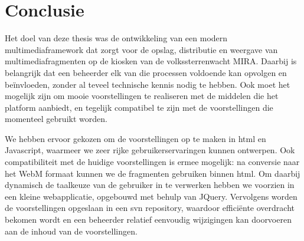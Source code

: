 \chapter{Conclusie}


Het doel van deze thesis was de ontwikkeling van een modern multimediaframework dat zorgt voor de opslag, distributie en weergave van multimediafragmenten op de kiosken van de volkssterrenwacht MIRA. Daarbij is belangrijk dat een beheerder elk van die processen voldoende kan opvolgen en beïnvloeden, zonder al teveel technische kennis nodig te hebben. Ook moet het mogelijk zijn om mooie voorstellingen te realiseren met de middelen die het platform aanbiedt, en tegelijk compatibel te zijn met de voorstellingen die momenteel gebruikt worden.

We hebben ervoor gekozen om de voorstellingen op te maken in \ac{html} en Javascript, waarmeer we zeer rijke gebruikerservaringen kunnen ontwerpen. Ook compatibiliteit met de huidige voorstellingen is ermee mogelijk: na conversie naar het WebM formaat kunnen we de fragmenten gebruiken binnen \ac{html}. Om daarbij dynamisch de taalkeuze van de gebruiker in te verwerken hebben we voorzien in een kleine webapplicatie, opgebouwd met behulp van JQuery.
Vervolgens worden de voorstellingen opgeslaan in een \ac{svn} repository, waardoor efficiënte overdracht bekomen wordt en een beheerder relatief eenvoudig wijzigingen kan doorvoeren aan de inhoud van de voorstellingen.







